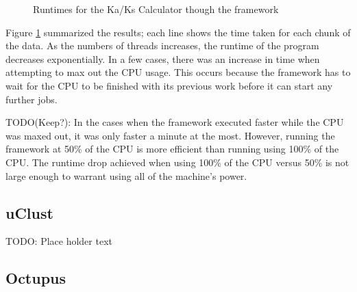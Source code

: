 \documentclass[12pt]{article}
\begin{document}
\begin{figure}
{}
\caption{Runtimes for the Ka/Ks Calculator though the framework}
\label{fig:kaksgraph}
\end{figure}

Figure \ref{fig:kaksgraph} summarized the results; each line shows the time taken for each chunk
of the data. As the numbers of threads increases, the runtime of the program
decreases exponentially. In a few cases, there was an increase in time when
attempting to max out the CPU usage. This occurs because the framework has to
wait for the CPU to be finished with its previous work before it can start any
further jobs. 

TODO(Keep?): In the cases when the framework executed faster while the CPU was 
maxed out, it was only faster a minute at the most. However, running the 
framework at 50\% of the CPU is more efficient than running using 100\% of the 
CPU. The runtime drop achieved when using 100\% of the CPU versus 50\% is not 
large enough to warrant using all of the machine's power.

\subsection{uClust}

TODO: Place holder text

\subsection{Octupus}
\end{document}
